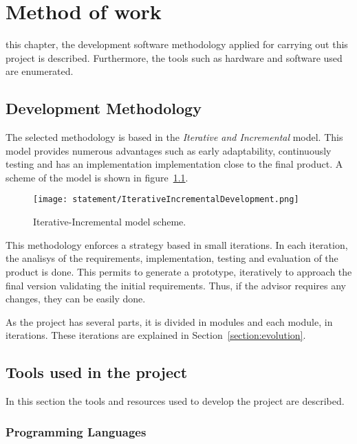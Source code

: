 \chapter{Method of work}
\label{chap:method}
 this chapter, the development software methodology applied for carrying
out this project is described. Furthermore, the tools such as hardware and software used are enumerated.
 
\section{Development Methodology}
The selected methodology is based in the \emph{Iterative and Incremental}
model. This model provides numerous advantages such as early adaptability,
continuously testing and has an implementation implementation close to the final product. A
scheme of the model is shown in figure~\ref{fig:IncrementalModel}.


\begin{figure}[!h]
\begin{center}
\texttt{[image: statement/IterativeIncrementalDevelopment.png]}
\caption{Iterative-Incremental model scheme.}
\label{fig:IncrementalModel}
\end{center}
\end{figure}

This methodology enforces a strategy based in small iterations. In each
iteration, the analisys of the requirements, implementation, testing and
evaluation of the product is done. This permits to generate a prototype,
iteratively to approach the final version validating the initial
requirements. Thus, if the advisor requires any changes, they can be easily done.
 
As the project has several parts, it is divided in modules and each module, in iterations. These iterations are explained in Section~\ref{section:evolution}.

\section{Tools used in the project}

In this section the tools and resources used to develop the project are described.  



\subsection{Programming Languages}

